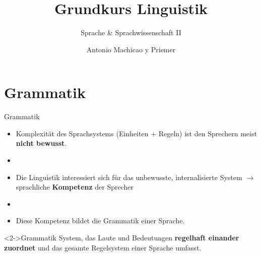 

\title{Grundkurs Linguistik}

\subtitle{Sprache \& Sprachwissenschaft II}

\author[aMyP]{
	{\small Antonio Machicao y Priemer}
}


\date{ }





\huberlintitlepage


	
%
\section{Grammatik}
	
\begin{frame}{Grammatik}
	\begin{itemize}
		\item Komplexität des Sprachsystems (Einheiten + Regeln) ist den Sprechern meist \textbf{nicht bewusst}.
		\item[]
		\item Die Linguistik interessiert sich für das unbewusste, internalisierte System $\rightarrow$ sprachliche \textbf{Kompetenz} der Sprecher
		\item[]
		\item Diese Kompetenz bildet die Grammatik einer Sprache.
	\end{itemize}
	
	\begin{block}<2->{Grammatik}
		System, das Laute und Bedeutungen \textbf{regelhaft einander zuordnet} und das gesamte Regelsystem einer Sprache umfasst.
	\end{block}	
\end{frame}


